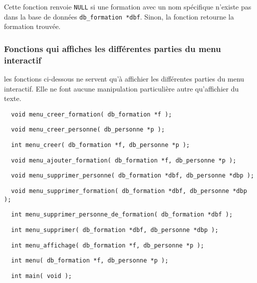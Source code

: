 \documentclass[11pt]{article}
\begin{document}
Cette fonction renvoie \texttt{NULL} si une formation avec un nom spécifique n'existe pas dans la base de données \texttt{db\_formation *dbf}. Sinon, la fonction retourne la formation trouvée.

\subsubsection{Fonctions qui affiches les différentes parties du menu interactif}
les fonctions ci-dessous ne servent qu'à affichier les différentes parties du menu interactif. Elle ne font aucune manipulation particulière autre qu'affichier du texte.
\begin{lstlisting}
  void menu_creer_formation( db_formation *f );
\end{lstlisting}

\begin{lstlisting}
  void menu_creer_personne( db_personne *p );
\end{lstlisting}

\begin{lstlisting}
  int menu_creer( db_formation *f, db_personne *p );
\end{lstlisting}

\begin{lstlisting}
  void menu_ajouter_formation( db_formation *f, db_personne *p );
\end{lstlisting}

\begin{lstlisting}
  void menu_supprimer_personne( db_formation *dbf, db_personne *dbp );
\end{lstlisting}

\begin{lstlisting}
  void menu_supprimer_formation( db_formation *dbf, db_personne *dbp );
\end{lstlisting}

\begin{lstlisting}
  int menu_supprimer_personne_de_formation( db_formation *dbf );
\end{lstlisting}

\begin{lstlisting}
  int menu_supprimer( db_formation *dbf, db_personne *dbp );
\end{lstlisting}

\begin{lstlisting}
  int menu_affichage( db_formation *f, db_personne *p );
\end{lstlisting}

\begin{lstlisting}
  int menu( db_formation *f, db_personne *p );
\end{lstlisting}

\begin{lstlisting}
  int main( void );
\end{lstlisting}

\newpage
\printglossary
\end{document}
